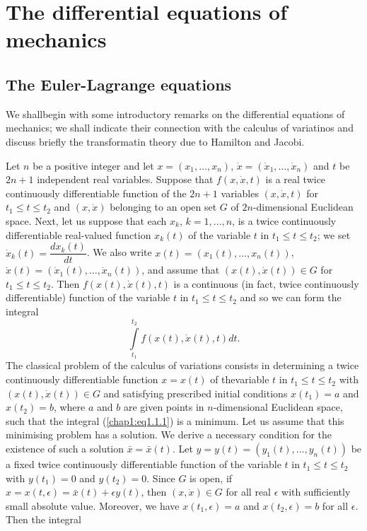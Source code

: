 
\chapter{The differential equations of mechanics}\label{chap1}

\section{The Euler-Lagrange equations}\label{chap1:sec1}

We shall\pageoriginale begin with some introductory remarks on the differential equations of mechanics; we shall indicate their connection with the calculus of variatinos and discuss briefly the transformatin theory due to Hamilton and Jacobi. 

Let $n$ be a positive integer and let $x=(x_1, \ldots, x_n)$, $\dot{x} = (\dot{x}_1, \ldots, \dot{x}_n)$ and $t$ be $2n+1$ independent real variables. Suppose that $f(x, \dot{x}, t)$ is a real twice continuously differentiable function of the $2n+1$ variables $(x, \dot{x}, t )$ for $t_1 \leq t \leq t_2$ and $(x, \dot{x})$ belonging to an open set $G$ of $2n$-dimensional Euclidean space. Next, let us suppose that each $x_k$, $k = 1, \ldots, n$, is a twice continuously differentiable real-valued function $x_k (t)$ of the variable $t$ in $t_1 \leq t \leq t_2$; we set $\dot{x}_k (t) = \dfrac{dx_k(t)}{dt}$. We also write $x(t) = (x_1(t), \ldots, x_n(t))$, $\dot{x} (t) = (\dot{x}_1(t), \ldots, \dot{x}_n(t))$, and assume that $(x(t), \dot{x}(t)) \in G$ for $t_1 \leq t \leq t_2$. Then $f(x(t), \dot{x} (t),t)$ is a continuous (in fact, twice continuously differentiable) function of the variable $t$ in $t_1 \leq t \leq t_2$ and so we can form the integral
\begin{equation*}
\int\limits^{t_2}_{t_1} f(x(t), \dot{x}(t), t) dt. 
\tag{1.1.1}\label{chap1:eq1.1.1}
\end{equation*}
The classical problem of the calculus of variations consists in determining a twice continuously differentiable function $x = x(t)$ of the\pageoriginale variable $t$ in $t_1 \leq t \leq t_2$ with $(x(t), \dot{x}(t)) \in G$  and satisfying prescribed initial conditions $x(t_1) = a$ and $x(t_2) = b$, where $a$ and $b$ are given points in $n$-dimensional Euclidean space, such that the integral (\ref{chap1:eq1.1.1}) is a minimum. Let us assume that this minimising problem has a solution. We derive a necessary condition for the existence of such a solution $\bar{x} = \bar{x}(t)$. Let $y = y(t) = (y_1 (t), \ldots, y_n(t))$ be a fixed twice continuously differentiable function of the variable $t$ in $t_1 \leq t \leq t_2$ with $y(t_1) = 0$ and $y(t_2) = 0$. Since $G$ is open, if $x = x(t, \epsilon) = \bar{x}(t) + \epsilon y(t)$, then $(x, \dot{x}) \in G$ for all real $\epsilon$ with sufficiently small absolute value. Moreover, we have $x(t_1, \epsilon) = a$ and $x(t_2 , \epsilon) = b$ for all $\epsilon$. Then the integral
